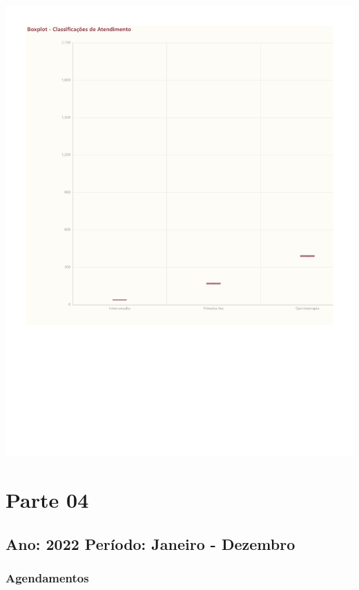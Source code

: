 \documentclass[
  letterpaper,
  DIV=11,
  numbers=noendperiod]{scrreprt}
\begin{document}
\includegraphics{2023_files/figure-pdf/unnamed-chunk-9-1.pdf}

\part{Parte 04}

\hypertarget{ano-2022-peruxedodo-janeiro---dezembro}{%
\chapter*{Ano: 2022 \textbar{} Período: Janeiro -
Dezembro}\label{ano-2022-peruxedodo-janeiro---dezembro}}


\hypertarget{agendamentos-3}{%
\section*{Agendamentos}\label{agendamentos-3}}
\end{document}
